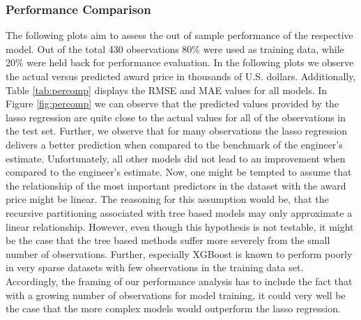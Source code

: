 \documentclass[a4paper,12pt, headsepline]{scrartcl}
\numberwithin{equation}{section}
\begin{document}
\subsubsection{Performance Comparison}
The following plots aim to assess the out of sample performance of the respective model. Out of the total 430 observations 80\% were used as training data, while 20\% were held back for performance evaluation. In the following plots we observe the actual versus predicted award price in thousands of U.S. dollars. Additionally, Table \ref{tab:percomp} displays the RMSE and MAE values for all models. In Figure \ref{fig:percomp} we can observe that the predicted values provided by the lasso regression are quite close to the actual values for all of the observations in the test set. Further, we observe that for many observations the lasso regression delivers a better prediction when compared to the benchmark of the engineer's estimate. Unfortunately, all other models did not lead to an improvement when compared to the engineer's estimate. Now, one might be tempted to assume that the relationship of the most important predictors in the dataset with the award price might be linear. The reasoning for this assumption would be, that the recursive partitioning associated with tree based models may only approximate a linear relationship. However, even though this hypothesis is not testable, it might be the case that the tree based methods suffer more severely from the small number of observations. Further, especially XGBoost is known to perform poorly in very sparse datasets with few observations in the training data set. Accordingly, the framing of our performance analysis has to include the fact that with  a growing number of observations for model training, it could very well be the case that the more complex models would outperform the lasso regression. 
\end{document}
